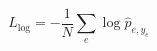 \par\needspace{70pt}\begin{minipage}{\linewidth}
\begin{equation}L_{\log}=-\frac1N\sum_e\log\widehat p_{e,y_e}\label{eq:14}\end{equation}
\end{minipage}\par
